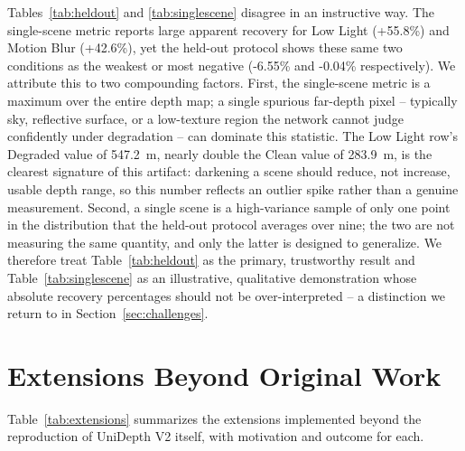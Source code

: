 \documentclass[conference]{IEEEtran}
\begin{document}
Tables~\ref{tab:heldout} and \ref{tab:singlescene} disagree in an instructive way. The single-scene metric reports large apparent recovery for Low Light (+55.8\%) and Motion Blur (+42.6\%), yet the held-out protocol shows these same two conditions as the weakest or most negative (-6.55\% and -0.04\% respectively). We attribute this to two compounding factors. First, the single-scene metric is a maximum over the entire depth map; a single spurious far-depth pixel -- typically sky, reflective surface, or a low-texture region the network cannot judge confidently under degradation -- can dominate this statistic. The Low Light row's Degraded value of 547.2~m, nearly double the Clean value of 283.9~m, is the clearest signature of this artifact: darkening a scene should reduce, not increase, usable depth range, so this number reflects an outlier spike rather than a genuine measurement. Second, a single scene is a high-variance sample of only one point in the distribution that the held-out protocol averages over nine; the two are not measuring the same quantity, and only the latter is designed to generalize. We therefore treat Table~\ref{tab:heldout} as the primary, trustworthy result and Table~\ref{tab:singlescene} as an illustrative, qualitative demonstration whose absolute recovery percentages should not be over-interpreted -- a distinction we return to in Section~\ref{sec:challenges}.

\section{Extensions Beyond Original Work}
\label{sec:extensions}

Table~\ref{tab:extensions} summarizes the extensions implemented beyond the reproduction of UniDepth V2 itself, with motivation and outcome for each.
\end{document}
